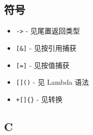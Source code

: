 
\subsection{符号}

\begin{itemize}
\item \texttt{->} - 见尾置返回类型
\item \texttt{[\&]} - 见按引用捕获
\item \texttt{[=]} - 见按值捕获
\item \texttt{[]()} - 见 Lambda 语法
\item \texttt{+[]\{\}} - 见转换
\end{itemize}

\subsection{C}

